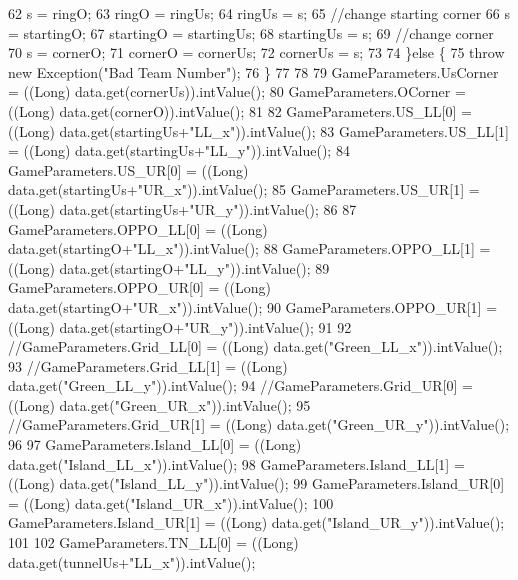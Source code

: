 \begin{DoxyCode}
62         s = ringO;
63         ringO = ringUs;
64         ringUs = s;
65         \textcolor{comment}{//change starting corner}
66         s = startingO;
67         startingO = startingUs;
68         startingUs = s;
69         \textcolor{comment}{//change corner}
70         s = cornerO;
71         cornerO = cornerUs;
72         cornerUs = s;
73         
74       \}\textcolor{keywordflow}{else} \{
75         \textcolor{keywordflow}{throw} \textcolor{keyword}{new} Exception(\textcolor{stringliteral}{"Bad Team Number"});
76       \}
77       
78       
79       GameParameters.UsCorner = ((Long) data.get(cornerUs)).intValue();
80       GameParameters.OCorner = ((Long) data.get(cornerO)).intValue();
81 
82       GameParameters.US\_LL[0] = ((Long) data.get(startingUs+\textcolor{stringliteral}{"LL\_x"})).intValue();
83       GameParameters.US\_LL[1] = ((Long) data.get(startingUs+\textcolor{stringliteral}{"LL\_y"})).intValue();
84       GameParameters.US\_UR[0] = ((Long) data.get(startingUs+\textcolor{stringliteral}{"UR\_x"})).intValue();
85       GameParameters.US\_UR[1] = ((Long) data.get(startingUs+\textcolor{stringliteral}{"UR\_y"})).intValue();
86 
87       GameParameters.OPPO\_LL[0] = ((Long) data.get(startingO+\textcolor{stringliteral}{"LL\_x"})).intValue();
88       GameParameters.OPPO\_LL[1] = ((Long) data.get(startingO+\textcolor{stringliteral}{"LL\_y"})).intValue();
89       GameParameters.OPPO\_UR[0] = ((Long) data.get(startingO+\textcolor{stringliteral}{"UR\_x"})).intValue();
90       GameParameters.OPPO\_UR[1] = ((Long) data.get(startingO+\textcolor{stringliteral}{"UR\_y"})).intValue();
91       
92       \textcolor{comment}{//GameParameters.Grid\_LL[0] = ((Long) data.get("Green\_LL\_x")).intValue();}
93       \textcolor{comment}{//GameParameters.Grid\_LL[1] = ((Long) data.get("Green\_LL\_y")).intValue();}
94       \textcolor{comment}{//GameParameters.Grid\_UR[0] = ((Long) data.get("Green\_UR\_x")).intValue();}
95       \textcolor{comment}{//GameParameters.Grid\_UR[1] = ((Long) data.get("Green\_UR\_y")).intValue();}
96 
97       GameParameters.Island\_LL[0] = ((Long) data.get(\textcolor{stringliteral}{"Island\_LL\_x"})).intValue();
98       GameParameters.Island\_LL[1] = ((Long) data.get(\textcolor{stringliteral}{"Island\_LL\_y"})).intValue();
99       GameParameters.Island\_UR[0] = ((Long) data.get(\textcolor{stringliteral}{"Island\_UR\_x"})).intValue();
100       GameParameters.Island\_UR[1] = ((Long) data.get(\textcolor{stringliteral}{"Island\_UR\_y"})).intValue();
101 
102       GameParameters.TN\_LL[0] = ((Long) data.get(tunnelUs+\textcolor{stringliteral}{"LL\_x"})).intValue();

\end{DoxyCode}
